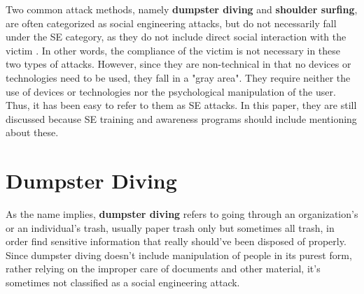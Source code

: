 Two common attack methods, namely \textbf{dumpster diving} and \textbf{shoulder surfing}, are often categorized as social engineering attacks, but do not necessarily fall under the SE category, as they do not include direct social interaction with the victim \citep{wang_defining_2020}. In other words, the compliance of the victim is not necessary in these two types of attacks. However, since they are non-technical in that no devices or technologies need to be used, they fall in a "gray area". They require neither the use of devices or technologies nor the psychological manipulation of the user. Thus, it has been easy to refer to them as SE attacks. In this paper, they are still discussed because SE training and awareness programs should include mentioning about these.

\section{Dumpster Diving}

As the name implies, \textbf{dumpster diving} refers to going through an organization's or an individual's trash, usually paper trash only but sometimes all trash, in order find sensitive information that really should've been disposed of properly. Since dumpster diving doesn't include manipulation of people in its purest form, rather relying on the improper care of documents and other material, it's sometimes not classified as a social engineering attack.




